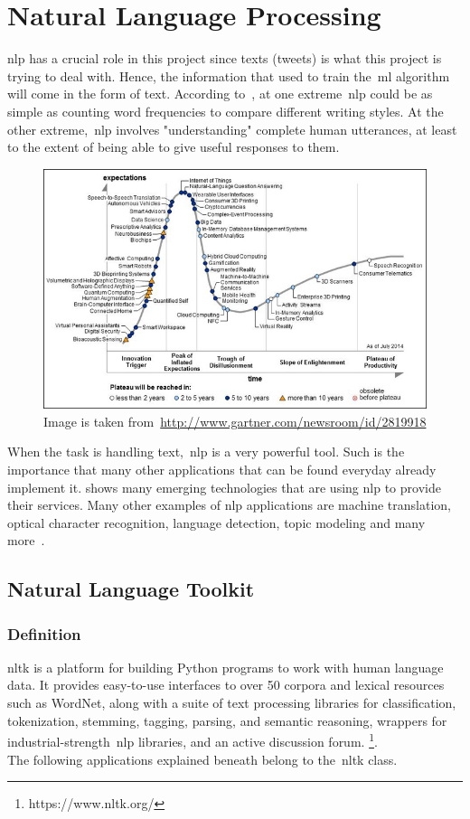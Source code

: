 \section{Natural Language Processing}
\ac{nlp} has a crucial role in this project since texts (tweets) is what this project is trying to deal with. Hence, the information that used to train the~\ac{ml} algorithm will come in the form of text. According to~\cite{bird2009natural}, at one extreme~\ac{nlp} could be as simple as counting word frequencies to compare different writing styles. At the other extreme,~\ac{nlp} involves "understanding" complete human utterances, at least to the extent of being able to give useful responses to them.\\
\begin{figure}
	\includegraphics[width=\linewidth]{img/nlp.jpg}
	\caption{Image is taken from~\url{http://www.gartner.com/newsroom/id/2819918}}
	\label{fig:nlptech}
\end{figure}
When the task is handling text,~\ac{nlp} is a very powerful tool. Such is the importance that many other applications that can be found everyday already implement it.  shows many emerging technologies that are using \ac{nlp} to provide their services.
Many other examples of \ac{nlp} applications are machine translation, optical character recognition, language detection, topic modeling and many more~\cite{stopwords}.

\label{sec:NLP}
\subsection{Natural Language Toolkit}
\subsubsection{Definition}
\ac{nltk} is a platform for building Python programs to work with human language data. It provides easy-to-use interfaces to over 50 corpora and lexical resources such as WordNet, along with a suite of text processing libraries for classification, tokenization, stemming, tagging, parsing, and semantic reasoning, wrappers for industrial-strength~\ac{nlp} libraries, and an active discussion forum. \footnote{https://www.nltk.org/}.\\
The following applications explained beneath belong to the~\ac{nltk} class.
